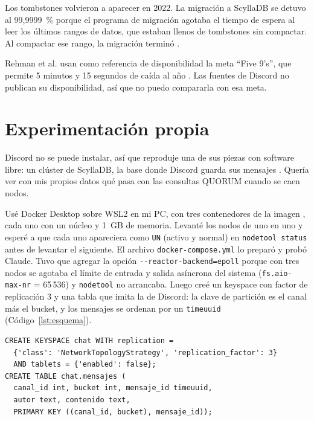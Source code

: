 \documentclass[11pt,a4paper]{article}
\begin{document}
Los tombstones volvieron a aparecer en 2022. La migración a ScyllaDB se detuvo al 99,9999~\% porque el programa de migración agotaba el tiempo de espera al leer los últimos rangos de datos, que estaban llenos de tombstones sin compactar. Al compactar ese rango, la migración terminó \cite{Ingram2023}.

Rehman et al. usan como referencia de disponibilidad la meta \enquote{Five 9's}, que permite 5 minutos y 15 segundos de caída al año \cite{Rehman2022}. Las fuentes de Discord no publican su disponibilidad, así que no puedo compararla con esa meta.

\section{Experimentación propia}\label{sec:experimento}

Discord no se puede instalar, así que reproduje una de sus piezas con software libre: un clúster de ScyllaDB, la base donde Discord guarda sus mensajes \cite{Ingram2023}. Quería ver con mis propios datos qué pasa con las consultas QUORUM cuando se caen nodos.

Usé Docker Desktop sobre WSL2 en mi PC, con tres contenedores de la imagen , cada uno con un núcleo y 1~GB de memoria. Levanté los nodos de uno en uno y esperé a que cada uno apareciera como \texttt{UN} (activo y normal) en \texttt{nodetool status} antes de levantar el siguiente. El archivo \texttt{docker-compose.yml} lo preparó y probó Claude. Tuvo que agregar la opción \texttt{-{}-reactor-backend=epoll} porque con tres nodos se agotaba el límite de entrada y salida asíncrona del sistema (\texttt{fs.aio-max-nr} = 65\,536) y \texttt{nodetool} no arrancaba. Luego creé un keyspace con factor de replicación 3 y una tabla que imita la de Discord: la clave de partición es el canal más el bucket, y los mensajes se ordenan por un \texttt{timeuuid} (Código~\ref{lst:esquema}).

\begin{lstlisting}[caption={Esquema de la base del experimento},label={lst:esquema}]
CREATE KEYSPACE chat WITH replication =
  {'class': 'NetworkTopologyStrategy', 'replication_factor': 3}
  AND tablets = {'enabled': false};
CREATE TABLE chat.mensajes (
  canal_id int, bucket int, mensaje_id timeuuid,
  autor text, contenido text,
  PRIMARY KEY ((canal_id, bucket), mensaje_id));
\end{lstlisting}
\end{document}
